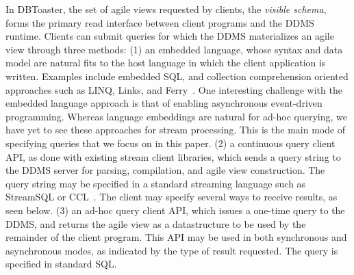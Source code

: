 In DBToaster, the set of agile views requested by clients, the \textit{visible
schema}, forms the primary read interface between client programs and the DDMS
runtime. Clients can submit queries for which the DDMS materializes an agile
view through three methods:
(1) an embedded language, whose syntax and data model are natural fits to the
host language in which the client application is written. Examples include
embedded SQL, and collection comprehension oriented approaches such as LINQ,
Links, and Ferry~\cite{cooper-fmco:06,grust-sigmod:09,meijer-sigmod:06}.
One interesting challenge with the embedded language approach is that of
enabling asynchronous event-driven programming. Whereas language embeddings
are natural for ad-hoc querying, we have yet to see these approaches
for stream processing. This is the main mode of specifying queries that we
focus on in this paper.
(2) a continuous query client API, as done with existing stream client
libraries, which sends a query string to the DDMS server for parsing,
compilation, and agile view construction. The query string may be specified in a
standard streaming language such as StreamSQL or CCL~\cite{jain-pvldb:08}. The
client may specify several ways to receive results, as seen below.
(3) an ad-hoc query client API, which issues a one-time query to the
DDMS, and returns the agile view as a datastructure to be used by the remainder
of the client program. This API may be used in both synchronous and
asynchronous modes, as indicated by the type of result requested. The query is
specified in standard SQL.

